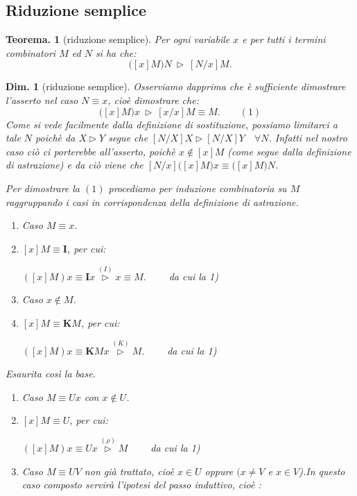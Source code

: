 \documentclass{book}
\newtheorem{teorema}{Teorema.}[chapter]
\newtheorem{dimostrazione}{Dim.}[chapter]
\newcommand*{\ii}{\mathbf{I}}    %
\newcommand*{\kk}{\mathbf{K}}    %
\begin{document}
\subsection{Riduzione semplice}
\begin{teorema}[riduzione semplice]
Per ogni variabile $x$ e per tutti i termini combinatori $M$ ed $N$ si ha che:
\[
\bigl([x]M\bigr)N \ \vartriangleright \ [N/x]M.
\]
\end{teorema}

\begin{dimostrazione}[riduzione semplice]
Osserviamo dapprima che \`e sufficiente dimostrare l'asserto nel caso $N
\equiv x$, cio\`e dimostrare che:
\[
\bigl([x]M\bigr)x \ \vartriangleright \ [x/x]M \equiv M.\qquad  (1)
\]
Come si vede facilmente dalla definizione di sostituzione, possiamo limitarci
a tale $N$ poich\`e da $X \vartriangleright Y$ segue che $[N/X]X
\vartriangleright [N/X]Y\quad \forall N$. Infatti nel nostro caso ci\`o ci
porterebbe all'asserto, poich\`e $x \notin [x]M$ (come segue dalla definizione
di astrazione) e da ci\`o viene che $[N/x]\bigl([x]M\bigr)x \equiv \bigl([x]M
\bigr)N$.

 Per dimostrare la $(1)$ procediamo per induzione combinatoria su $M$
raggruppando i casi in corrispondenza della definizione di astrazione.

\begin{enumerate}
\item[$\bullet$]Caso $M \equiv x$.
   \item[] $[x]M  \equiv  \ii$, per cui:

 $([x]M)x
\equiv  \ii x  \stackrel{(I)}{\vartriangleright}  x \equiv
 M. \qquad$ da cui la 1)
\item[$\bullet$]Caso $x \notin M$.
    \item[]$[x]M \equiv  \kk M$,  per cui:

 $([x]M)x \equiv  \kk Mx  \stackrel{(K)}{\vartriangleright}  M. \qquad$ da
cui la 1)
\end{enumerate}

Esaurita cos\`i la base.
\vspace{0.3 cm}

\begin{enumerate}
\item[$\bullet$]Caso $M \equiv Ux$ con $x \notin U$.
    \item[]$[x]M \equiv  U$,  per cui:

 $([x]M)x \equiv  Ux  \stackrel{(\rho)}{\vartriangleright} M \qquad$
da cui la 1)
\item[$\bullet$]Caso $M \equiv UV$ non gi\`a trattato, cio\`e $x \in U
$ oppure $ ( x \neq V$ e $x \in V$).In questo caso composto servir\`a
l'ipotesi del passo induttivo, cio\`e :


\end{enumerate}
\end{dimostrazione}
\end{document}
